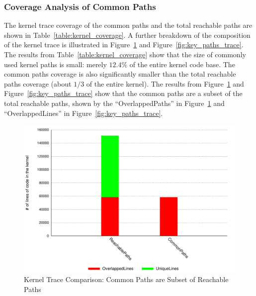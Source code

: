 \subsubsection{Coverage Analysis of Common Paths}
The kernel trace coverage of the common paths and the total reachable paths are shown in Table~\ref{table:kernel_coverage}. 
A further breakdown of the composition of the kernel trace is illustrated in Figure~\ref{fig:subset} and Figure~\ref{fig:key_paths_trace}.
%
The results from Table~\ref{table:kernel_coverage} show that the size of commonly used kernel 
paths is small: merely $12.4\%$ of the entire kernel code base. The common paths coverage
is also significantly smaller than the total reachable paths coverage (about $1/3$ of the entire kernel). 
The results from Figure~\ref{fig:subset} and Figure~\ref{fig:key_paths_trace} show that the common paths are a subset of the total reachable paths, shown by the ``OverlappedPaths'' in Figure~\ref{fig:subset} and ``OverlappedLines'' in Figure~\ref{fig:key_paths_trace}. 

\begin{figure}%
\centering
\includegraphics[width=1.0\columnwidth]{diagram/lind_ccs15_diagram_01.pdf}
\caption{Kernel Trace Comparison: Common Paths are Subset of Reachable Paths }
\label{fig:subset}
\end{figure}

